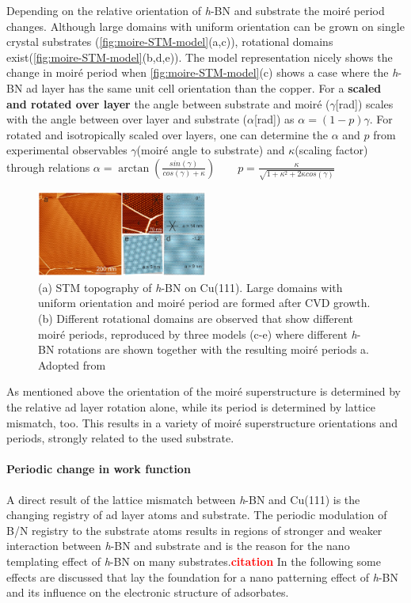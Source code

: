 Depending on the relative orientation of \textit{h}-BN and substrate the moir\'e period changes. Although large domains with uniform orientation can be grown on single crystal substrates (\autoref{fig:moire-STM-model}(a,c)), rotational domains exist(\autoref{fig:moire-STM-model}(b,d,e)).
The model representation nicely shows the change in moir\'e period when
\autoref{fig:moire-STM-model}(c) shows a case where the \textit{h}-BN ad layer has the same unit cell orientation than the copper. For a \textbf{scaled and rotated over layer} the angle between substrate and moir\'e ($\gamma$[rad]) scales with the angle between over layer and substrate ($\alpha$[rad]) as $\alpha=(1-p)\gamma$.
For rotated and isotropically scaled over layers, one can determine the $\alpha$ and $p$ from experimental observables $\gamma$(moir\'e angle to substrate) and $\kappa$(scaling factor) through relations $ \alpha=\arctan \left ( \frac{sin(\gamma)}{cos(\gamma)+\kappa} \right )\qquad p=\frac{\kappa}{\sqrt{1+\kappa^2+2\kappa cos(\gamma)}}$

\begin{figure} \centering
	\includegraphics[width=0.5\textwidth]{./images/h-BN-cvd-cu111.png}%
\caption{(a) STM topography of \textit{h}-BN on Cu(111). Large domains with uniform orientation and moir\'e period are formed after CVD growth. (b) Different rotational domains are observed that show different moir\'e periods, reproduced by three models (c-e) where different \textit{h}-BN rotations are shown together with the resulting moir\'e periods a. Adopted from \cite{joshi_boron_2012}}
\label{fig:moire-STM-model}
\end{figure}

As mentioned above the orientation of the moir\'e superstructure is determined by the relative ad layer rotation alone, while its period is determined by lattice mismatch, too. This results in a variety of moir\'e superstructure orientations and periods, strongly related to the used substrate.
	
\paragraph{Periodic change in work function}
A direct result of the lattice mismatch between \textit{h}-BN and Cu(111) is the changing registry of ad layer atoms and substrate. The periodic modulation of B/N registry to the substrate atoms results in regions of stronger and weaker interaction between \textit{h}-BN and substrate and is the reason for the nano templating effect of \textit{h}-BN on many substrates.\textcolor{red}{\textbf{citation}} In the following some effects are discussed that lay the foundation for a nano patterning effect of \textit{h}-BN and its influence on the electronic structure of adsorbates.

